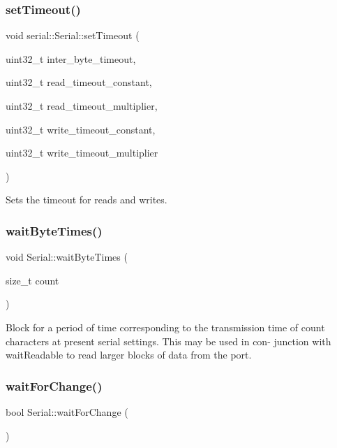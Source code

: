 \subsubsection{\texorpdfstring{set\+Timeout()}{setTimeout()}\hspace{0.1cm}{\footnotesize\ttfamily [2/2]}}
{\footnotesize\ttfamily void serial\+::\+Serial\+::set\+Timeout (\begin{DoxyParamCaption}\item[{uint32\+\_\+t}]{inter\+\_\+byte\+\_\+timeout,  }\item[{uint32\+\_\+t}]{read\+\_\+timeout\+\_\+constant,  }\item[{uint32\+\_\+t}]{read\+\_\+timeout\+\_\+multiplier,  }\item[{uint32\+\_\+t}]{write\+\_\+timeout\+\_\+constant,  }\item[{uint32\+\_\+t}]{write\+\_\+timeout\+\_\+multiplier }\end{DoxyParamCaption})\hspace{0.3cm}{\ttfamily [inline]}}

Sets the timeout for reads and writes. \mbox{\label{classserial_1_1_serial_a318262c05074a9da15d410f8af29c15c}} 
\subsubsection{\texorpdfstring{wait\+Byte\+Times()}{waitByteTimes()}}
{\footnotesize\ttfamily void Serial\+::wait\+Byte\+Times (\begin{DoxyParamCaption}\item[{size\+\_\+t}]{count }\end{DoxyParamCaption})}

Block for a period of time corresponding to the transmission time of count characters at present serial settings. This may be used in con-\/ junction with wait\+Readable to read larger blocks of data from the port. \mbox{\label{classserial_1_1_serial_a419dc984258956a5adb41fb8c86f5449}} 
\subsubsection{\texorpdfstring{wait\+For\+Change()}{waitForChange()}}
{\footnotesize\ttfamily bool Serial\+::wait\+For\+Change (\begin{DoxyParamCaption}{ }\end{DoxyParamCaption})}

